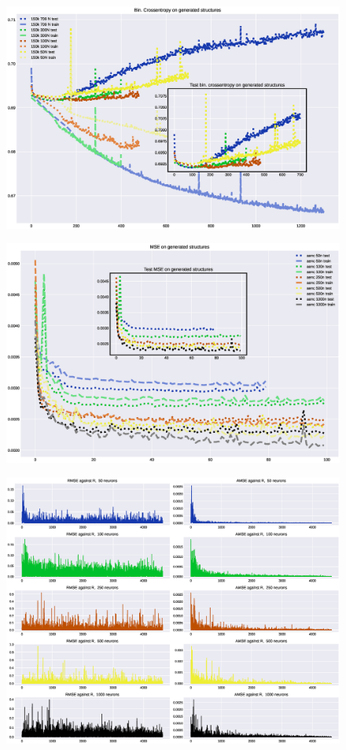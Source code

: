 \documentclass{article}
\begin{document}
\begin{figure}[h!tp]
\centering
\includegraphics[scale=.500]{imgs/loss-lsize.eps}
\caption{}
\label{}
\end{figure}

\begin{figure}[htp]
\centering
\includegraphics[scale=0.50]{imgs/loss-aenc.eps}
\caption{}
\label{}
\end{figure}

\begin{figure}[htp]
\centering
\includegraphics[scale=0.50]{imgs/aenc-errdist.eps}
\caption{}
\label{}
\end{figure}
\end{document}
